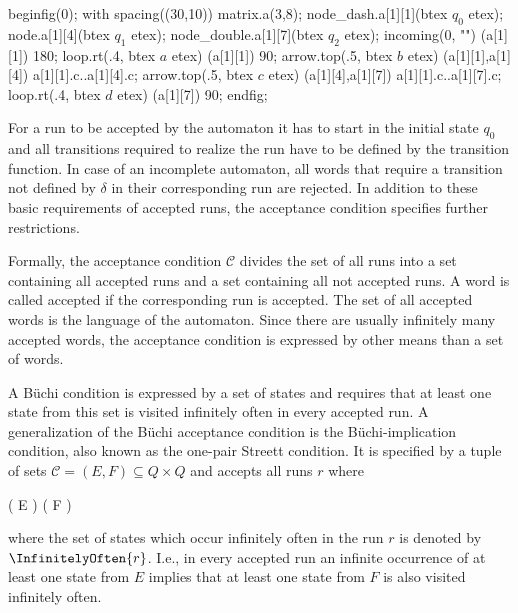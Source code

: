 \stopsubsection


    beginfig(0);
        with spacing((30,10)) matrix.a(3,8);
        node_dash.a[1][1](btex $q_0$ etex);
        node.a[1][4](btex $q_1$ etex);
        node_double.a[1][7](btex $q_2$ etex);
        incoming(0, "") (a[1][1]) 180;
        loop.rt(.4, btex \;$a$ etex) (a[1][1]) 90;
        arrow.top(.5, btex $b$ etex) (a[1][1],a[1][4]) a[1][1].c..a[1][4].c;
        arrow.top(.5, btex $c$ etex) (a[1][4],a[1][7]) a[1][1].c..a[1][7].c;
        loop.rt(.4, btex \;$d$ etex) (a[1][7]) 90;
    endfig;
\stopreusableMPgraphic

\startsubsection[title={Acceptance Conditions}]

    For a run to be accepted by the automaton it has to start in the initial state $q_0$ and all transitions required to realize the run have to be defined by the transition function.
    In case of an incomplete automaton, all words that require a transition not defined by $\delta$ in their corresponding run are rejected.
    In addition to these basic requirements of accepted runs, the acceptance condition specifies further restrictions.

    Formally, the acceptance condition ${\mathcal C}$ divides the set of all runs into a set containing all accepted runs and a set containing all not accepted runs.
    A word is called accepted if the corresponding run is accepted.
    The set of all accepted words is the language of the automaton.
    Since there are usually infinitely many accepted words, the acceptance condition is expressed by other means than a set of words.

    A Büchi condition is expressed by a set of states and requires that at least one state from this set is visited infinitely often in every accepted run.
    A generalization of the Büchi acceptance condition is the Büchi-implication condition, also known as the one-pair Streett condition.
    It is specified by a tuple of sets $\mathcal{C} = (E, F) \subseteq Q \times Q$ and accepts all runs $r$ where

    \startformula
        ( \cap E \ne \emptyset) \Longrightarrow ( \cap F \ne \emptyset) \EndComma
    \stopformula

    where the set of states which occur infinitely often in the run $r$ is denoted by $\InfinitelyOften{r}$.
    I.e., in every accepted run an infinite occurrence of at least one state from $E$ implies that at least one state from $F$ is also visited infinitely often.


